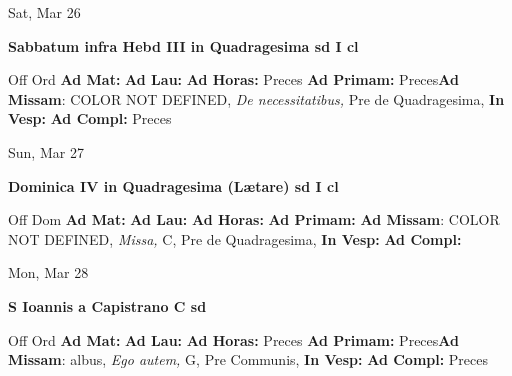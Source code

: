 \documentclass[10pt]{memoir}
\begin{document}
\begin{center}
\begin{minipage}{3.5in}
\vspace{2em}
\begin{center}Sat, Mar 26
\end{center}
\textbf{ \large Sabbatum infra Hebd III in Quadragesima
\textnormal{\normalsize sd I cl}}

\begin{justify}Off Ord
\textbf{Ad Mat: }
\textbf{Ad Lau: }
\textbf{Ad Horas: }Preces
\textbf{Ad Primam: }Preces\textbf{Ad Missam}: COLOR NOT DEFINED, \textit{De necessitatibus,} Pre de Quadragesima, 
\textbf{In Vesp: }
\textbf{Ad Compl: }Preces
\end{justify}
\end{minipage}
\end{center}

\begin{center}
\begin{minipage}{3.5in}
\vspace{2em}
\begin{center}Sun, Mar 27
\end{center}
\textbf{ \large Dominica IV in Quadragesima (Lætare)
\textnormal{\normalsize sd I cl}}

\begin{justify}Off Dom
\textbf{Ad Mat: }
\textbf{Ad Lau: }
\textbf{Ad Horas: }
\textbf{Ad Primam: }\textbf{Ad Missam}: COLOR NOT DEFINED, \textit{Missa,} C, Pre de Quadragesima, 
\textbf{In Vesp: }
\textbf{Ad Compl: }
\end{justify}
\end{minipage}
\end{center}

\begin{center}
\begin{minipage}{3.5in}
\vspace{2em}
\begin{center}Mon, Mar 28
\end{center}
\textbf{ \large S Ioannis a Capistrano C
\textnormal{\normalsize sd}}

\begin{justify}Off Ord
\textbf{Ad Mat: }
\textbf{Ad Lau: }
\textbf{Ad Horas: }Preces
\textbf{Ad Primam: }Preces\textbf{Ad Missam}: albus, \textit{Ego autem,} G, Pre Communis, 
\textbf{In Vesp: }
\textbf{Ad Compl: }Preces
\end{justify}
\end{minipage}
\end{center}
\end{document}
